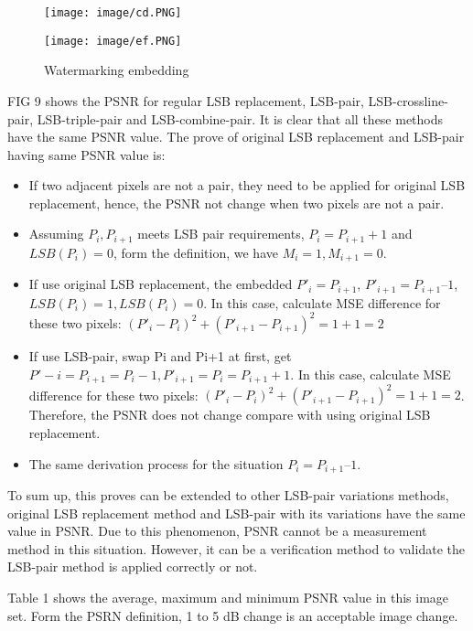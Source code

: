 \documentclass[%
    reprint,
    amsmath,amssymb,
    aps,
   ]{revtex4-1}
\begin{document}
   \begin{figure}[h]
   \texttt{[image: image/cd.PNG]}
   \label{fig:figure}
   \end{figure} 
   
   \begin{figure}[h]
   \texttt{[image: image/ef.PNG]}
   \caption{Watermarking embedding}
   \label{fig:figure}
   \end{figure} 
   
   FIG 9 shows the PSNR for regular LSB replacement, LSB-pair, LSB-crossline-pair, LSB-triple-pair and LSB-combine-pair. It is clear that all these methods have the same PSNR value. The prove of original LSB replacement and LSB-pair having same PSNR value is: 
   
   \begin{itemize}
     \item If two adjacent pixels are not a pair, they need to be applied for original LSB replacement, hence, the PSNR not change when two pixels are not a pair.
     \item Assuming \(P_{i}, P_{i+1}\) meets LSB pair requirements, \(P_{i} = P_{i+1} + 1\) and \(LSB(P_{i}) = 0\), form the definition, we have \(M_{i} = 1, M_{i+1} = 0\).
     \item If use original LSB replacement, the embedded \(P'_{i} = P_{i + 1}\), \(P'_{i+1} = P_{i+1} – 1\), \(LSB(P_{i}) = 1, LSB(P_{i}) = 0\). In this case, calculate MSE difference for these two pixels: \((P'_{i} - P_{i})^2 + (P'_{i+1} - P_{i+1})^2 = 1 + 1 = 2\)
     \item If use LSB-pair, swap Pi and Pi+1 at first, get \(P'-{i} = P_{i+1} = P_{i} - 1, P'_{i+1} = P_{i} = P_{i+1} + 1\). In this case, calculate MSE difference for these two pixels: \((P'_{i} - P_{i})^2 + (P'_{i+1} - P_{i+1})^2 = 1 + 1 = 2\). Therefore, the PSNR does not change compare with using original LSB replacement.
     \item The same derivation process for the situation \(P_{i} = P_{i+1} – 1\).
   \end{itemize}
   
         
   To sum up, this proves can be extended to other LSB-pair variations methods, original LSB replacement method and LSB-pair with its variations have the same value in PSNR. Due to this phenomenon, PSNR cannot be a measurement method in this situation. However, it can be a verification method to validate the LSB-pair method is applied correctly or not.
   
   
   Table 1 shows the average, maximum and minimum PSNR value in this image set. Form the PSRN definition, 1 to 5 dB change is an acceptable image change.
   
\end{document}

